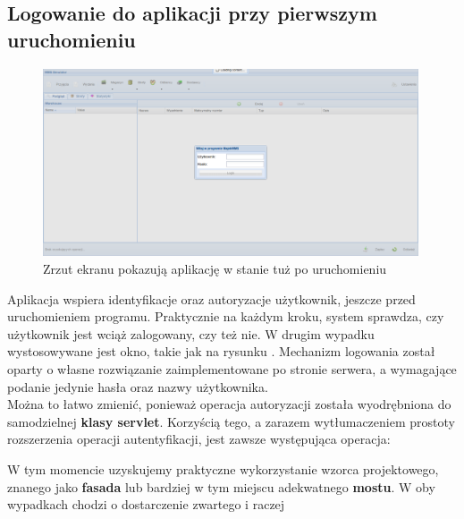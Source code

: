 	\subsection{Logowanie do aplikacji przy pierwszym uruchomieniu}
		\begin{figure}[H]
			\centering
			\includegraphics[width=0.99\textwidth]{images/app/login}
			\caption[Aplikacja - Logowanie do programu]{Zrzut ekranu pokazują aplikację w stanie tuż po uruchomieniu}
			\label{c7:fig:app:login}
		\end{figure}
		Aplikacja wspiera identyfikacje oraz autoryzacje użytkownik, jeszcze przed uruchomieniem programu. Praktycznie
		na każdym kroku, system sprawdza, czy użytkownik jest wciąż zalogowany, czy też nie. W drugim wypadku
		wystosowywane jest okno, takie jak na rysunku \label{c7:fig:app::login}. Mechanizm logowania został oparty
		o własne rozwiązanie zaimplementowane po stronie serwera, a wymagające podanie jedynie hasła oraz 
		nazwy użytkownika.\\ Można to łatwo zmienić, ponieważ operacja autoryzacji została wyodrębniona
		do samodzielnej \textbf{klasy servlet}. Korzyścią tego, a zarazem wytłumaczeniem prostoty rozszerzenia
		operacji autentyfikacji, jest zawsze występująca operacja:
		W tym momencie uzyskujemy praktyczne wykorzystanie wzorca projektowego, znanego jako \textbf{fasada} lub bardziej
		w tym miejscu adekwatnego \textbf{mostu}. W oby wypadkach chodzi o dostarczenie zwartego i raczej 
